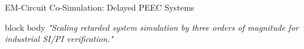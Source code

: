 \begin{frame}[t]{EM-Circuit Co-Simulation: Delayed PEEC Systems}
	\vfill
	\begin{beamercolorbox}[wd=\textwidth, sep=1.2ex, center, rounded=true]{block body}
		\small \itshape \textcolor{blue!80!black}{"Scaling retarded system simulation by three orders of magnitude for industrial SI/PI verification."}
	\end{beamercolorbox}
\end{frame}
